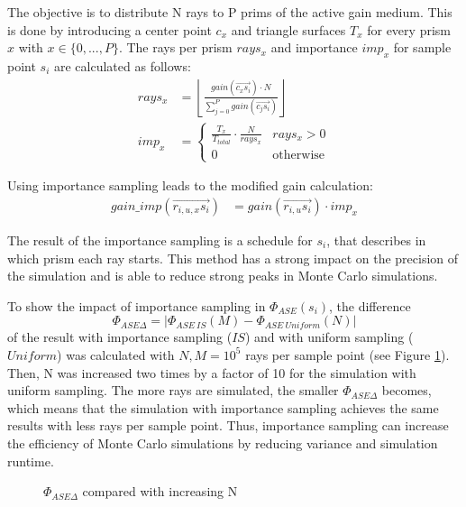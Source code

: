 The objective is to distribute N rays to P prims of the active gain medium.
This is done by introducing a center point $c_x$ and triangle surfaces $T_x$ for every prism $x$ with $x \in \{0,...,P\}$.
 The rays per prism $rays_x$ and importance $imp_x$ for sample point $s_i$ are calculated as follows:
\begin{align}
  rays_x       &= \left\lfloor\frac{gain(\overrightarrow{c_xs_i}) \cdot N}{\sum^{P}_{j=0} gain(\overrightarrow{c_js_i})}\right\rfloor\\
imp_x &= 
\begin{cases}
\frac{T_x}{T_{total}} \cdot \frac{N}{rays_x} &rays_x > 0\\
0 &\text{otherwise}
\end{cases}
\end{align}

Using importance sampling leads to the modified gain calculation:
\begin{align}
  gain\_imp(\overrightarrow{r_{i,u,x}s_i})        &= gain(\overrightarrow{r_{i,u}s_i}) \cdot imp_x
\end{align}


The result of the importance sampling is a schedule for $s_i$, that
describes in which prism each ray starts.
This method has a strong impact on the precision of the simulation
and is able to reduce strong peaks in Monte Carlo simulations.

To show the impact of importance sampling in $\Phi_{ASE}(s_i)$, the difference
\[\Phi_{ASE\Delta} = |\Phi_{ASE~IS}(M) - \Phi_{ASE~Uniform}(N)|\] of the 
result with importance sampling ($IS$) and with uniform sampling ($Uniform$) was calculated with 
$N,M = 10^5$ rays per sample point (see Figure \ref{graphic:importance}). 
Then, N was increased two times by a factor of 10 for the simulation with uniform sampling.
The more rays are simulated, the smaller $\Phi_{ASE\Delta}$ becomes, which 
means that the simulation
with importance sampling achieves the same results with less
rays per sample point. Thus, importance sampling can increase the
efficiency of Monte Carlo simulations by reducing variance 
and simulation runtime. 
\begin{figure}[H]
  \centerline
  {}
  \caption{$\Phi_{ASE\Delta}$ compared with increasing N}
  \label{graphic:importance}
\end{figure}


